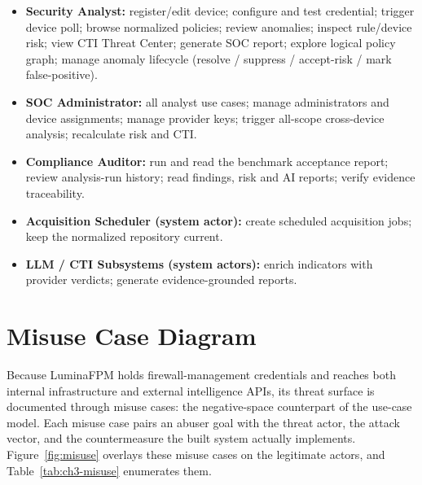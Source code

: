 \documentclass[12pt,a4paper]{report}
\renewcommand{\_}{\textunderscore\allowbreak}
\begin{document}
\begin{itemize}[leftmargin=1.4em]
  \item \textbf{Security Analyst:} register/edit device; configure and test credential; trigger device poll; browse normalized policies; review anomalies; inspect rule/device risk; view CTI Threat Center; generate SOC report; explore logical policy graph; manage anomaly lifecycle (resolve / suppress / accept-risk / mark false-positive).
  \item \textbf{SOC Administrator:} all analyst use cases; manage administrators and device assignments; manage provider keys; trigger all-scope cross-device analysis; recalculate risk and CTI.
  \item \textbf{Compliance Auditor:} run and read the benchmark acceptance report; review analysis-run history; read findings, risk and AI reports; verify evidence traceability.
  \item \textbf{Acquisition Scheduler (system actor):} create scheduled acquisition jobs; keep the normalized repository current.
  \item \textbf{LLM / CTI Subsystems (system actors):} enrich indicators with provider verdicts; generate evidence-grounded reports.
\end{itemize}

\section{Misuse Case Diagram}
\label{sec:ch3-misuse}

Because LuminaFPM holds firewall-management credentials and reaches both internal infrastructure and external intelligence APIs, its threat surface is documented through misuse cases: the negative-space counterpart of the use-case model. Each misuse case pairs an abuser goal with the threat actor, the attack vector, and the countermeasure the built system actually implements. Figure~\ref{fig:misuse} overlays these misuse cases on the legitimate actors, and Table~\ref{tab:ch3-misuse} enumerates them.
\end{document}
